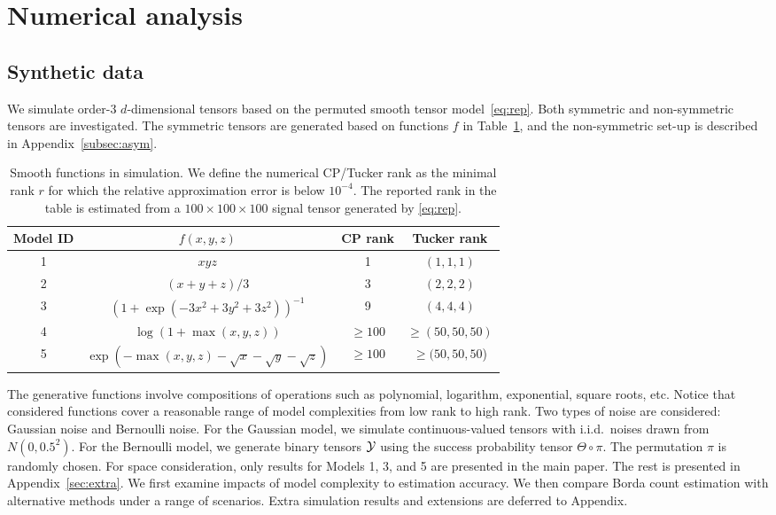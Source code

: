 \documentclass[12pt]{article}
\theoremstyle{definition}
\begin{document}
\section{Numerical analysis}\label{sec:sim}

\subsection{Synthetic data}
We simulate order-3 $d$-dimensional tensors based on the permuted smooth tensor model~\eqref{eq:rep}. Both symmetric and non-symmetric tensors are investigated. The symmetric tensors are generated based on functions $f$ in Table~\ref{tb:md}, and the non-symmetric set-up is described in Appendix~\ref{subsec:asym}.
\begin{table}[htp]
    \centering
    \begin{tabular}{c|c|c|c}
        Model ID  &  $f(x,y,z)$ & CP rank & Tucker rank \\\hline
        1 &    $xyz$ & 1 & $(1,1,1)$\\
        2 &    $(x+y+z)/3$ & 3 & $(2,2,2)$\\
        3 & $(1+\exp(-3x^2+3y^2+3z^2))^{-1}$ &9& $(4,4,4)$ \\
        4 & $\log(1+\max(x,y,z))$ &$\geq 100$& $\geq (50,50,50)$ \\
        5 &  $\exp\left(-\max(x,y,z)-\sqrt{x}-\sqrt{y}-\sqrt{z}\right)$ &$\geq 100$& $\geq (50,50,50$)
    \end{tabular}
    \caption{Smooth functions in simulation. We define the numerical CP/Tucker rank as the minimal rank $r$ for which the relative approximation error is below $10^{-4}$. The reported rank in the table is estimated from a $100\times100\times100$  signal tensor generated by \eqref{eq:rep}.}
    \label{tb:md}
\end{table}
The generative functions involve compositions of operations such as polynomial, logarithm, exponential, square roots, etc. Notice that considered functions cover a reasonable range of model complexities from low rank to high rank. Two types of noise are considered: Gaussian noise and Bernoulli noise.
For the Gaussian model, we simulate continuous-valued tensors with i.i.d.\ noises drawn from $N(0,0.5^2)$. For the Bernoulli model, we generate binary tensors $\mathcal{Y}$ using the success probability tensor $\Theta \circ \pi$. The permutation $\pi$ is randomly chosen. For space consideration, only results for Models 1, 3, and 5 are presented in the main paper. The rest is presented in Appendix~\ref{sec:extra}. We first examine impacts of model complexity to estimation accuracy. We then compare Borda count estimation with alternative methods under a range of scenarios. Extra simulation results and extensions are deferred to Appendix.
\end{document}
